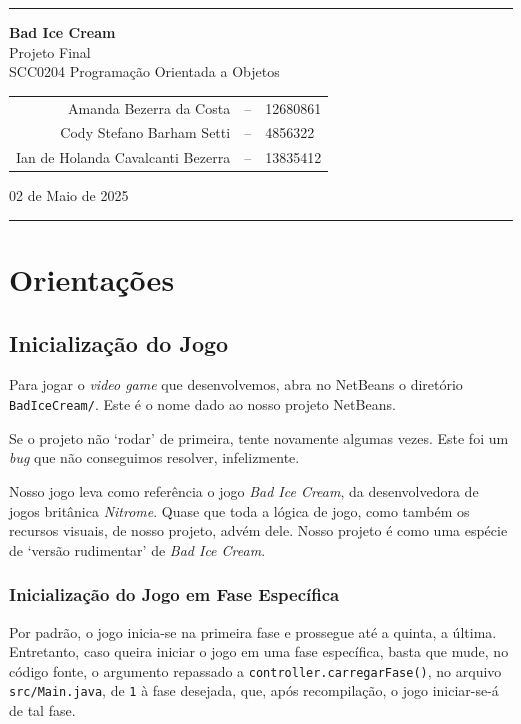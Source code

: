 \documentclass[10pt,a4paper,portuguese]{article}
\begin{document}
    \vspace{5mm}
    \rule{0.95\textwidth}{1pt}
    \vspace{3mm}
    \begin{center}
        \textbf{\huge Bad Ice Cream} \\
        \Large Projeto Final \\
        \large SCC0204 Programação Orientada a Objetos
    
        \vspace{8mm}
        \begin{tabular}{rcl}
            Amanda Bezerra da Costa &-- &12680861 \\
            Cody Stefano Barham Setti &-- &4856322 \\
            Ian de Holanda Cavalcanti Bezerra &-- &13835412
        \end{tabular}

    \vspace{8mm}
    02 de Maio de 2025
    \end{center}

    \vspace{1mm}
    \rule{0.95\textwidth}{1pt}
    \vspace{0.5cm}

    \section{Orientações}
    \subsection{Inicialização do Jogo}
        Para jogar o \emph{video game} que desenvolvemos, abra no NetBeans o diretório \verb|BadIceCream/|. Este é o nome dado ao nosso projeto NetBeans.

        Se o projeto não `rodar' de primeira, tente novamente algumas vezes. Este foi um \emph{bug} que não conseguimos resolver, infelizmente.
        
        Nosso jogo leva como referência o jogo \emph{Bad Ice Cream}, da desenvolvedora de jogos britânica \emph{Nitrome}. Quase que toda a lógica de jogo, como também os recursos visuais, de nosso projeto, advém dele. Nosso projeto é como uma espécie de `versão rudimentar' de \emph{Bad Ice Cream}.

    \subsubsection{Inicialização do Jogo em Fase Específica}
        Por padrão, o jogo inicia-se na primeira fase e prossegue até a quinta, a última. Entretanto, caso queira iniciar o jogo em uma fase específica, basta que mude, no código fonte, o argumento repassado a \verb|controller.carregarFase()|, no arquivo \verb|src/Main.java|, de \verb|1| à fase desejada, que, após recompilação, o jogo iniciar-se-á de tal fase.
        
\end{document}
